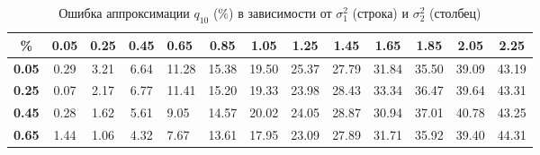 \documentclass[12pt]{article}
\begin{document}
	\begin{table}[!hhh]
		\caption{Ошибка аппроксимации $q_{10}$ ($\%$) в зависимости от $\sigma_{1}^{2}$ (строка) и $\sigma_{2}^{2}$ (столбец)}
		\label{tab2}
		\begin{tabular}{|c|ccclcccccccc}
			\hline
			\textbf{\%}                         & \multicolumn{1}{c|}{\textbf{0.05}} & \multicolumn{1}{c|}{\textbf{0.25}} & \multicolumn{1}{c|}{\textbf{0.45}} & \multicolumn{1}{l|}{\textbf{0.65}} & \multicolumn{1}{c|}{\textbf{0.85}} & \multicolumn{1}{c|}{\textbf{1.05}} & \multicolumn{1}{c|}{\textbf{1.25}} & \multicolumn{1}{c|}{\textbf{1.45}} & \multicolumn{1}{c|}{\textbf{1.65}} & \multicolumn{1}{c|}{\textbf{1.85}} & \multicolumn{1}{c|}{\textbf{2.05}} & \multicolumn{1}{c|}{\textbf{2.25}} \\ \hline
			\textbf{0.05}                       & 0.29                               & 3.21                               & 6.64                               & \multicolumn{1}{c}{11.28}          & 15.38                              & 19.50                              & 25.37                              & 27.79                              & 31.84                              & 35.50                              & 39.09                              & 43.19                              \\ \cline{1-1}
			\textbf{0.25}                       & 0.07                               & 2.17                               & 6.77                               & 11.41                              & 15.20                              & 19.33                              & 23.98                              & 28.43                              & 33.34                              & 36.47                              & 39.64                              & 43.31                              \\ \cline{1-1}
			\textbf{0.45}                       & 0.28                               & 1.62                               & 5.61                               & 9.05                               & 14.57                              & 20.02                              & 24.05                              & 28.87                              & 30.94                              & 37.01                              & 40.78                              & 43.25                              \\ \cline{1-1}
			\textbf{0.65}                       & 1.44                               & 1.06                               & 4.32                               & 7.67                               & 13.61                              & 17.95                              & 23.09                              & 27.89                              & 31.71                              & 35.92                              & 39.40                              & 44.31                              \\ \cline{1-1}

\end{tabular}
\end{table}
\end{document}

